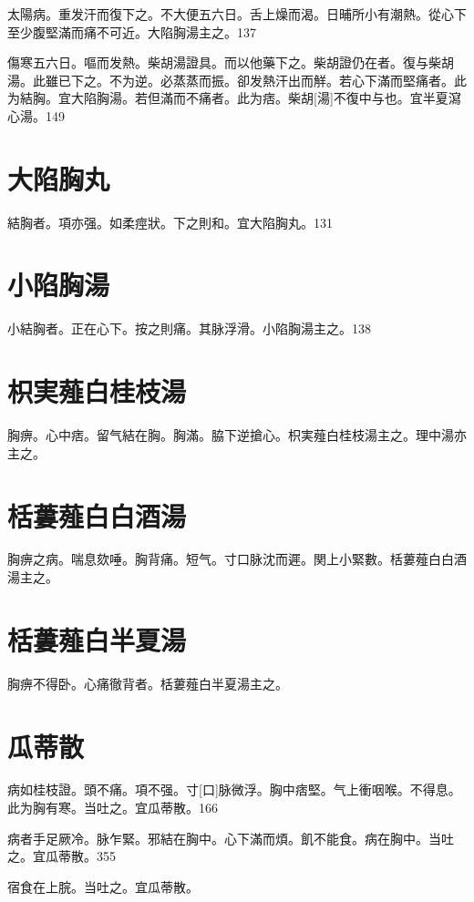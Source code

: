 \documentclass[12pt,twoside,UTF8,b5paper]{ctexbook}
\begin{document}
太陽病。重发汗而復下之。不大便五六日。舌上燥而渴。日晡所小有潮熱。從心下至少腹堅滿而痛不可近。大陷胸湯主之。137

傷寒五六日。嘔而发熱。柴胡湯證具。而以他藥下之。柴胡證仍在者。復与柴胡湯。此雖已下之。不为逆。必蒸蒸而振。卻发熱汗出而觧。若心下滿而堅痛者。此为結胸。宜大陷胸湯。若但滿而不痛者。此为痞。柴胡[湯]不復中与也。宜半夏瀉心湯。149

\section{大陷胸丸}

結胸者。項亦强。如柔痙狀。下之則和。宜大陷胸丸。131

\section{小陷胸湯}

小結胸者。正在心下。按之則痛。其脉浮滑。小陷胸湯主之。138

\section{枳実薤白桂枝湯}

胸痹。心中痞。留气結在胸。胸滿。脇下逆搶心。枳実薤白桂枝湯主之。理中湯亦主之。

\section{栝蔞薤白白酒湯}

胸痹之病。喘息欬唾。胸背痛。短气。寸口脉沈而遲。関上小緊數。栝蔞薤白白酒湯主之。

\section{栝蔞薤白半夏湯}

胸痹不得卧。心痛徹背者。栝蔞薤白半夏湯主之。

\section{瓜蒂散}

病如桂枝證。頭不痛。項不强。寸[口]脉微浮。胸中痞堅。气上衝咽喉。不得息。此为胸有寒。当吐之。宜瓜蒂散。166

病者手足厥冷。脉乍緊。邪結在胸中。心下滿而煩。飢不能食。病在胸中。当吐之。宜瓜蒂散。355

宿食在上脘。当吐之。宜瓜蒂散。
\end{document}
